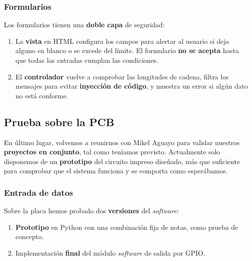 \documentclass[10pt,a4paper]{article}
\begin{document}
	\subsubsection*{Formularios}
	
	Los formularios tienen una \textbf{doble capa} de seguridad:
	 
	\begin{enumerate}
		\item La \textbf{vista} en HTML configura los campos para alertar al usuario si deja alguno en blanco o se excede del límite. El formulario \textbf{no se acepta} hasta que todas las entradas cumplan las condiciones.
	 	
	 	\item El \textbf{controlador} vuelve a comprobar las longitudes de cadena, filtra los mensajes para evitar \textbf{inyección de código}, y muestra un error si algún dato no está conforme.
	\end{enumerate}
	
	\clearpage
	\subsection{Prueba sobre la PCB}
	
	En último lugar, volvemos a reunirnos con Mikel Aguayo para validar nuestros \textbf{proyectos en conjunto}, tal como teníamos previsto. Actualmente solo disponemos de un \textbf{prototipo} del circuito impreso diseñado, más que suficiente para comprobar que el sistema funciona y se comporta como esperábamos.
	
	\subsubsection*{Entrada de datos}
	
	Sobre la placa hemos probado dos \textbf{versiones} del \textit{software}:
	
	\begin{enumerate}
		\item \textbf{Prototipo} en Python con una combinación fija de notas, como prueba de concepto.
		\item Implementación \textbf{final} del módulo \textit{software} de salida por GPIO.
	\end{enumerate}
	
\end{document}
